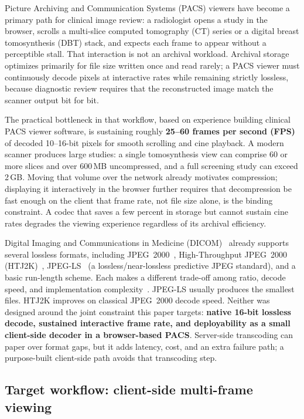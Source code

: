 \documentclass[journal]{IEEEtran}
\begin{document}
 Picture Archiving and Communication Systems (PACS)
viewers have become a primary path for clinical image review: a radiologist
opens a study in the browser, scrolls a multi-slice computed tomography (CT)
series or a digital breast tomosynthesis (DBT) stack, and expects each frame to
appear without a perceptible stall. That interaction is not an archival
workload. Archival storage optimizes primarily for file size written once and
read rarely; a PACS viewer must continuously decode pixels at interactive rates
while remaining strictly lossless, because diagnostic review requires that the
reconstructed image match the scanner output bit for bit.

The practical bottleneck in that workflow, based on experience building clinical
PACS viewer software, is sustaining roughly \textbf{25--60 frames per second
(FPS)} of decoded 10--16-bit pixels for smooth scrolling and cine playback.
A modern scanner produces large studies: a single tomosynthesis view can
comprise 60 or more slices and over 600\,MB uncompressed, and a full screening
study can exceed 2\,GB. Moving that volume over the network already motivates
compression; displaying it interactively in the browser further requires that
decompression be fast enough on the client that frame rate, not file size alone,
is the binding constraint. A codec that saves a few percent in storage but
cannot sustain cine rates degrades the viewing experience regardless of its
archival efficiency.

Digital Imaging and Communications in Medicine (DICOM)~\cite{dicom} already
supports several lossless formats, including JPEG~2000~\cite{taubman2002},
High-Throughput JPEG~2000 (HTJ2K)~\cite{htj2k2019}, JPEG-LS~\cite{loco1} (a
lossless/near-lossless predictive JPEG standard), and a basic run-length scheme.
Each makes a different trade-off among ratio, decode speed, and
implementation complexity~\cite{liu2017,clunie2000}. JPEG-LS usually produces
the smallest files. HTJ2K improves on classical JPEG~2000 decode speed. Neither
was designed around the joint constraint this paper targets:
\textbf{native 16-bit lossless decode, sustained interactive frame rate, and
deployability as a small client-side decoder in a browser-based PACS}.
Server-side transcoding can paper over format gaps, but it adds latency, cost,
and an extra failure path; a purpose-built client-side path avoids that
transcoding step.

\subsection{Target workflow: client-side multi-frame viewing}
\label{sec:target-workflow}
\end{document}
